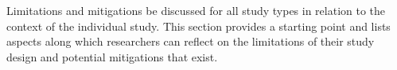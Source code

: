 
Limitations and mitigations \should be discussed for all study types in relation to the context of the individual study.
This section provides a starting point and lists aspects along which researchers can reflect on the limitations of their study design and potential mitigations that exist.
